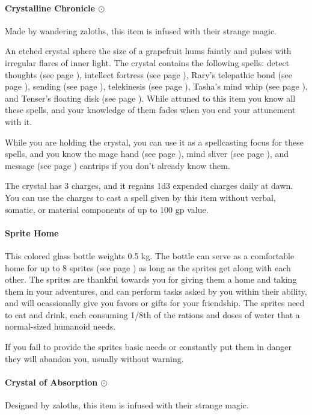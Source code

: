 \paragraph{Crystalline Chronicle $\odot$}
    Made by wandering zaloths, this item is infused with their strange magic.

    An etched crystal sphere the size of a grapefruit hums faintly and pulses with irregular flares of inner light.
    The crystal contains the following spells: detect thoughts (see page \pageref{spell::detectthoughts}), intellect fortress (see page \pageref{spell::intellectfortress}), Rary's telepathic bond (see page \pageref{spell::rarystelepathicbond}), sending (see page \pageref{spell::sending}), telekinesis (see page \pageref{spell::telekinesis}), Tasha's mind whip (see page \pageref{spell::tashasmindwhip}), and Tenser's floating disk (see page \pageref{spell::tensersfloatingdisc}).
    While attuned to this item you know all these spells, and your knowledge of them fades when you end your attunement with it.

    While you are holding the crystal, you can use it as a spellcasting focus for these spells, and you know the mage hand (see page \pageref{spell::magehand}), mind sliver (see page \pageref{spell::mindsliver}), and message (see page \pageref{spell::message}) cantrips if you don't already know them.

    The crystal has 3 charges, and it regains 1d3 expended charges daily at dawn.
    You can use the charges to cast a spell given by this item without verbal, somatic, or material components of up to 100 gp value.
\paragraph{Sprite Home} %
    This colored glass bottle weights 0.5 kg.
    The bottle can serve as a comfortable home for up to 8 sprites (see page \pageref{creature::sprite}) as long as the sprites get along with each other.
    The sprites are thankful towards you for giving them a home and taking them in your adventures, and can perform tasks asked by you within their ability, and will ocassionally give you favors or gifts for your friendship.
    The sprites need to eat and drink, each consuming 1/8th of the rations and doses of water that a normal-sized humanoid needs.

    If you fail to provide the sprites basic needs or constantly put them in danger they will abandon you, usually without warning.
\paragraph{Crystal of Absorption $\odot$}
    Designed by zaloths, this item is infused with their strange magic.

